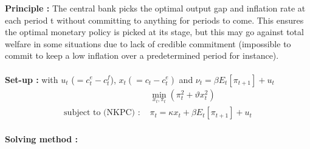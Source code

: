 \documentclass{article}
\begin{document}
\textbf{Principle :} The central bank picks the optimal output gap and inflation rate at each period t without committing to anything for periods to come. This ensures the optimal monetary policy is picked at its stage, but this may go against total welfare in some situations due to lack of credible commitment (impossible to commit to keep a low inflation over a predetermined period for instance).\\
\\\textbf{Set-up : } with $u_t$ ($=c_t^e-c_t^f$), $x_t (=c_t-c_t^e)$ and $\nu_t = \beta E_t[\pi_{t+1}]+u_t$
    \begin{equation}
    \begin{aligned}
        &\min_{x_t,\pi_t} (\pi_t^2+\vartheta x_t^2)\\
        \text{subject to (NKPC) : }& \pi_t = \kappa x_t+\beta E_t[\pi_{t+1}]+u_t
    \end{aligned}
    \end{equation}    
\\ \textbf{Solving method : }
\end{document}
